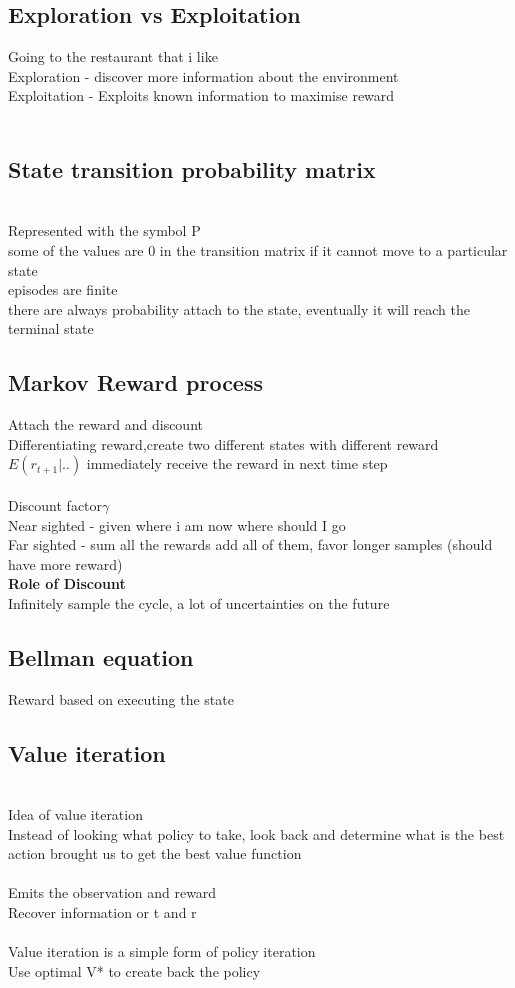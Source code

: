 \documentclass[11pt]{article}
\begin{document}
\subsection*{Exploration vs Exploitation}
Going to the restaurant that i like \\
Exploration - discover more information about the environment
\\
Exploitation - Exploits known information to maximise reward
\\\\
\subsection*{State transition probability matrix}\\
Represented with the symbol P\\
some of the values are 0 in the transition matrix if it cannot move to a particular state\\
episodes are finite\\
there are always probability attach to the state, eventually it will reach the terminal state
\subsection{Markov Reward process}
Attach the reward and discount\\
Differentiating reward,create two different states with different reward\\
$E(r_{t+1} | ..)$ immediately receive the reward in next time step
\\\\
Discount factor$\gamma $
\\ Near sighted - given where i am now where should I go
\\ Far sighted - sum all the rewards add all of them, favor longer samples (should have more reward)
\\
\textbf{Role of Discount}\\
Infinitely sample the cycle, a lot of uncertainties on the future
\subsection{Bellman equation}
Reward based on executing the state
\subsection*{Value iteration}\\
Idea of value iteration\\
Instead of looking what policy to take, look back and determine what is the best action brought us to get the best value function \\\\
Emits the observation and reward\\
Recover information or t and r\\
\\
Value iteration is a simple form of policy iteration\\
Use optimal V*  to create back the policy\\
\end{document}
